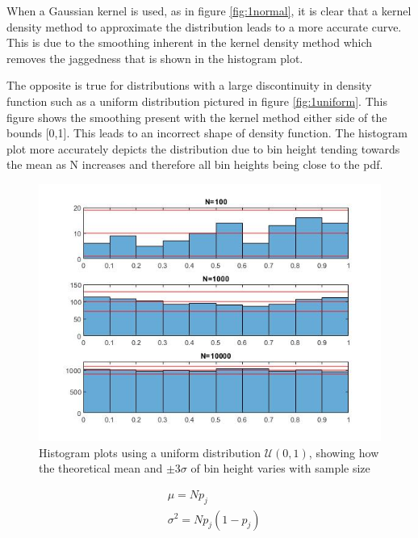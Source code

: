 \documentclass[twoside,twocolumn]{article}
\begin{document}
When a Gaussian kernel is used, as in figure \ref{fig:1normal}, it is clear that a kernel density method to approximate the distribution leads to a more accurate curve. This is due to the smoothing inherent in the kernel density method which removes the jaggedness that is shown in the histogram plot.

The opposite is true for distributions with a large discontinuity in density function such as a uniform distribution pictured in figure \ref{fig:1uniform}. This figure shows the smoothing present with the kernel method either side of the bounds [0,1]. This leads to an incorrect shape of density function. The histogram plot more accurately depicts the distribution due to bin height tending towards the mean as N increases and therefore all bin heights being close to the pdf.

\begin{figure}[h]
  \centering
    \includegraphics[width=\linewidth]{1means}
  \caption{Histogram plots using a uniform distribution $\mathcal{U}(0,1)$, showing how the theoretical mean and $\pm3\sigma$ of bin height varies with sample size}
  \label{fig:1means}
\end{figure}

\begin{equation}
\label{eq:1meancal}
\begin{split}
&\mu = Np_{j}\\
&\sigma^2=Np_j(1-p_j)\\
\end{split}
\end{equation} 
\end{document}
